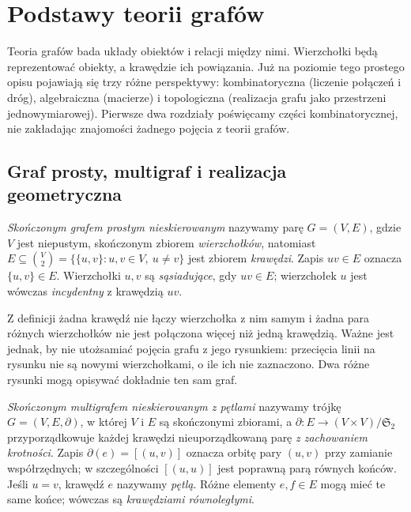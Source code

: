 \chapter{Podstawy teorii grafów}
\label{ch:tg-podstawy}

Teoria grafów bada układy obiektów i relacji między nimi. Wierzchołki będą
reprezentować obiekty, a krawędzie ich powiązania. Już na poziomie tego
prostego opisu pojawiają się trzy różne perspektywy: kombinatoryczna
(liczenie połączeń i dróg), algebraiczna (macierze) i topologiczna
(realizacja grafu jako przestrzeni jednowymiarowej). Pierwsze dwa rozdziały
poświęcamy części kombinatorycznej, nie zakładając znajomości żadnego
pojęcia z teorii grafów.

\section{Graf prosty, multigraf i realizacja geometryczna}
\label{sec:tg-obiekty}

\begin{definicja}
\emph{Skończonym grafem prostym nieskierowanym} nazywamy parę
$G=(V,E)$, gdzie $V$ jest niepustym, skończonym zbiorem
\emph{wierzchołków}, natomiast
$E\subseteq\binom V2=\{\{u,v\}:u,v\in V,\ u\ne v\}$
jest zbiorem \emph{krawędzi}. Zapis $uv\in E$ oznacza
$\{u,v\}\in E$. Wierzchołki $u,v$ są \emph{sąsiadujące},
gdy $uv\in E$; wierzchołek $u$ jest wówczas \emph{incydentny}
z krawędzią $uv$.
\end{definicja}

Z definicji żadna krawędź nie łączy wierzchołka z nim samym i żadna para
różnych wierzchołków nie jest połączona więcej niż jedną krawędzią.
Ważne jest jednak, by nie utożsamiać pojęcia grafu z jego rysunkiem:
przecięcia linii na rysunku nie są nowymi wierzchołkami, o ile ich
nie zaznaczono. Dwa różne rysunki mogą opisywać dokładnie ten sam graf.

\begin{definicja}
\emph{Skończonym multigrafem nieskierowanym z pętlami}
nazywamy trójkę $G=(V,E,\partial)$, w której $V$ i $E$ są
skończonymi zbiorami, a $\partial:E\to (V\times V)/\mathfrak S_2$
przyporządkowuje każdej krawędzi nieuporządkowaną parę
\emph{z zachowaniem krotności}. Zapis $\partial(e)=[(u,v)]$
oznacza orbitę pary $(u,v)$ przy zamianie współrzędnych;
w szczególności $[(u,u)]$ jest poprawną parą równych końców.
Jeśli $u=v$, krawędź $e$ nazywamy \emph{pętlą}.
Różne elementy $e,f\in E$ mogą mieć te same końce;
wówczas są \emph{krawędziami równoległymi}.
\end{definicja}

